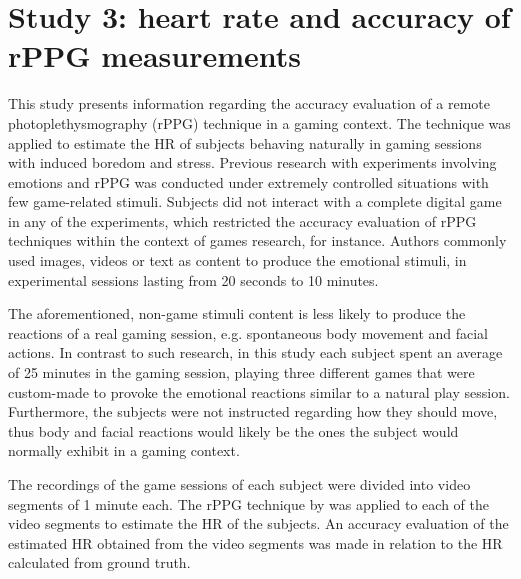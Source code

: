 \section{Study 3: heart rate and accuracy of rPPG measurements}
\label{sec:experiment1-study3}

This study presents information regarding the accuracy evaluation of a remote photoplethysmography (rPPG) technique in a gaming context. The technique was applied to estimate the HR of subjects behaving naturally in gaming sessions with induced boredom and stress. Previous research with experiments involving emotions and rPPG was conducted under extremely controlled situations with few game-related stimuli. Subjects did not interact with a complete digital game in any of the experiments, which restricted the accuracy evaluation of rPPG techniques within the context of games research, for instance. Authors commonly used images, videos or text as content to produce the emotional stimuli, in experimental sessions lasting from 20 seconds to 10 minutes.

The aforementioned, non-game stimuli content is less likely to produce the reactions of a real gaming session, e.g. spontaneous body movement and facial actions. In contrast to such research, in this study each subject spent an average of 25 minutes in the gaming session, playing three different games that were custom-made to provoke the emotional reactions similar to a natural play session. Furthermore, the subjects were not instructed regarding how they should move, thus body and facial reactions would likely be the ones the subject would normally exhibit in a gaming context.

The recordings of the game sessions of each subject were divided into video segments of 1 minute each. The rPPG technique by \textcite{poh2011advancements} was applied to each of the video segments to estimate the HR of the subjects. An accuracy evaluation of the estimated HR obtained from the video segments was made in relation to the HR calculated from ground truth.


